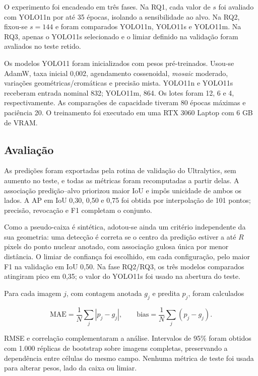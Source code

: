 O experimento foi encadeado em tr\^es fases. Na RQ1, cada valor de $s$ foi
avaliado com YOLO11n por at\'e 35 \'epocas, isolando a sensibilidade ao alvo. Na
RQ2, fixou-se $s=144$ e foram comparados YOLO11n, YOLO11s e YOLO11m. Na RQ3,
apenas o YOLO11s selecionado e o limiar definido na valida\c{c}\~ao foram
avaliados no teste retido.

Os modelos YOLO11 foram inicializados com pesos pr\'e-treinados. Usou-se AdamW,
taxa
inicial 0,002, agendamento cossenoidal, \textit{mosaic} moderado, varia\c{c}\~oes
geom\'etricas/crom\'aticas e precis\~ao mista. YOLO11n e YOLO11s receberam entrada
nominal 832; YOLO11m, 864. Os lotes foram 12, 6 e 4, respectivamente. As
compara\c{c}\~oes de capacidade tiveram 80 \'epocas m\'aximas e paci\^encia 20. O
treinamento foi executado em uma RTX 3060 Laptop com 6 GB de VRAM.

\subsection{Avalia\c{c}\~ao}

As predi\c{c}\~oes foram exportadas pela rotina de valida\c{c}\~ao do Ultralytics,
sem aumento no teste, e todas as m\'etricas foram recomputadas a partir delas. A
associa\c{c}\~ao predi\c{c}\~ao--alvo priorizou maior IoU e imp\^os unicidade de
ambos os lados. A AP em IoU 0,30, 0,50 e 0,75 foi obtida por interpola\c{c}\~ao de
101 pontos; precis\~ao, revoca\c{c}\~ao e F1 completam o conjunto.

Como a pseudo-caixa \'e sint\'etica, adotou-se ainda um crit\'erio independente da
sua geometria: uma detec\c{c}\~ao \'e correta se o centro da predi\c{c}\~ao estiver a
at\'e $R$ pixels do ponto nuclear anotado, com associa\c{c}\~ao gulosa \'unica por
menor dist\^ancia. O limiar de confian\c{c}a foi escolhido, em cada
configura\c{c}\~ao, pelo maior F1 na valida\c{c}\~ao em IoU 0,50. Na fase RQ2/RQ3,
os tr\^es modelos comparados atingiram pico em 0,35; o valor do YOLO11s foi usado
na abertura do teste.

Para cada imagem $j$, com contagem anotada $g_j$ e predita $p_j$, foram
calculados

\begin{equation}
\mathrm{MAE}=\frac{1}{N}\sum_j|p_j-g_j|,\qquad
\mathrm{bias}=\frac{1}{N}\sum_j(p_j-g_j).
\end{equation}

RMSE e correla\c{c}\~ao complementaram a an\'alise. Intervalos de 95\% foram
obtidos com 1.000 r\'eplicas de bootstrap sobre imagens completas, preservando a
depend\^encia entre c\'elulas do mesmo campo. Nenhuma m\'etrica de teste foi usada
para alterar pesos, lado da caixa ou limiar.

